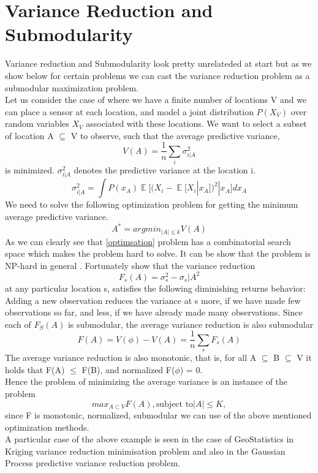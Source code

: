 \documentclass[a4paper,twoside]{iiththesis}
\theoremstyle{definition}
\theoremstyle{definition}
\theoremstyle{remark}
\DeclareMathOperator*{\E}{\mathop{\mathbb{E}}}
\begin{document}
\section{Variance Reduction and Submodularity }

Variance reduction and Submodularity look pretty unrelateded at start but as we show below for certain problems we can cast the variance reduction problem as a submodular maximization problem.
\\
Let us consider the case of where we have a finite number of locations V and we can place a sensor at each location, and model a joint distribution $P(X_V)$  over random variables $X_V$ associated with these locations. We want to select a subset of location A $\subseteq$ V to observe, such that the average predictive variance, 
\begin{equation}
	V(A) = \frac{1}{n} \sum_{i} \sigma_{i|A}^2
\end{equation}
is minimized. $\sigma_{i|A}^2$ denotes the predictive variance at the location i. 
\begin{equation}
\sigma_{i|A}^2 = \int P(x_A) \E\Bigg[ (X_i -\E[ X_i | x_A])^2 | x_A\Bigg] dx_A
\end{equation}
We need to solve the following optimization problem for getting the minimum average predictive variance.
\begin{equation}\label{optimsation}
A^* = argmin_{|A| \leq k} V(A)
\end{equation}
As we can clearly see that \ref{optimsation} problem has a combinatorial search space which makes the problem hard to solve. It can be show that the problem is NP-hard in general \cite{das2008algorithms}. Fortunately \cite{das2008algorithms} show that the variance reduction 
\begin{equation}
F_s(A) = \sigma_s^2 - \sigma_s|A ^2
\end{equation}
at any particular location s, satisfies the following diminishing returns behavior: Adding a new observation reduces the variance at s more, if we have made few observations so far, and less, if we have already made many observations. Since each of $F_S(A)$ is submodular, the average variance reduction is also submodular 
\begin{equation}
	F(A) = V(\phi) - V(A) = \frac{1}{n} \sum_{s} F_s(A)
\end{equation}
The average variance reduction is also monotonic, that is, for all A $\subseteq$ B $\subseteq$ V it
holds that F(A) $\leq$ F(B), and normalized F($\phi$) = 0. \\
Hence the problem of minimizing the average variance is an instance of the problem 
\begin{equation}
max_{A\subset V}F(A) , \text{subject to} |A| \leq K, 
\end{equation}
since F is monotonic, normalized, submodular we can use of the above mentioned optimization methods. \\
A particular case of the above example is seen in the case of GeoStatistics in Kriging variance reduction minimisation problem and also in the Gaussian Process predictive variance reduction problem. \\
\end{document}

